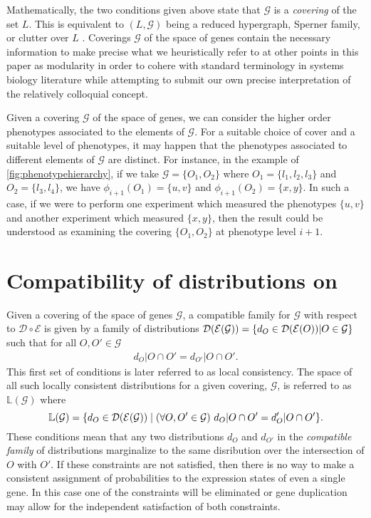 Mathematically, the two conditions given above state that $\mathcal{G}$ is a \emph{covering} of the set $L$.  This is equivalent to $(L, \mathcal{G})$ being a reduced hypergraph, Sperner family, or clutter over $L$ \cite{Lauritzen1996}.  Coverings $\mathcal{G}$ of the space of genes contain the necessary information to make precise what we heuristically refer to at other points in this paper as modularity in order to cohere with standard terminology in systems biology literature while attempting to submit our own precise interpretation of the relatively colloquial concept.

Given a covering $\mathcal{G}$ of the space of genes, we can consider the higher order phenotypes associated to the elements of $\mathcal{G}$.  For a suitable choice of cover and a suitable level of phenotypes, it may happen that the phenotypes associated to different elements of $\mathcal{G}$ are distinct.  For instance, in the example of \ref{fig:phenotypehierarchy}, if we take $\mathcal{G} = \{O_1, O_2\}$ where $O_1 = \{l_1, l_2, l_3\}$ and $O_2 = \{l_3, l_4\}$, we have $\phi_{i+1}(O_1) = \{u,v\}$ and $\phi_{i+1}(O_2) = \{x,y\}$.  In such a case, if we were to perform one experiment which measured the phenotypes $\{u,v\}$ and another experiment which measured $\{x,y\}$, then the result could be understood as examining the covering $\{O_1, O_2\}$ at phenotype level $i+1$.

\section{Compatibility of distributions on \gnpm{}}\label{sec:compatibilityofgpms}
Given a covering of the space of genes $\mathcal{G}$, a compatible family for $\mathcal{G}$ with respect to $\mathcal{D} \circ \mathcal{E}$ is given by a family of distributions $\mathcal{D}{}(\mathcal{E}{}(\mathcal{G})) = \{d_O \in \mathcal{D} (\mathcal{E}(O)) | O \in \mathcal{G}\}$ such that for all $O, O' \in \mathcal{G}$
\begin{eqnarray}\label{eq:sheafcond}
d_O|O \cap O' = d_{O'}|O \cap O'.
\end{eqnarray}
This first set of conditions is later referred to as local consistency. The space of all such locally consistent distributions for a given covering, $\mathcal{G}$, is referred to as $\mathbb{L}(\mathcal{G})$ where
\begin{equation}
\mathbb{L}(\mathcal{G}) = \{ d_O  \in \mathcal{D}{}(\mathcal{E}{}(\mathcal{G})) \mid (\forall O,O' \in \mathcal{G})\,\, d_O|O \cap O' = d_O'|O \cap O' \}.
\end{equation}
These conditions mean that any two distributions $d_O$ and $d_{O'}$ in the \emph{compatible family} of distributions marginalize to the same disribution over the intersection of $O$ with $O'$. If these constraints are not satisfied, then there is no way to make a consistent assignment of probabilities to the expression states of even a single gene. In this case one of the constraints will be eliminated or gene duplication may allow for the independent satisfaction of both constraints.

